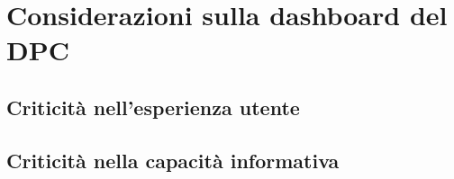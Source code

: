\documentclass[../../main.tex]{subfiles}
\begin{document}
\section{Considerazioni sulla dashboard del DPC}


\subsection{Criticità nell'esperienza utente}
\subsection{Criticità nella capacità informativa}
\end{document}
